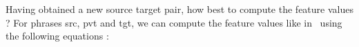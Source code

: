 \begin{comment}
Facing a new low resource language pair, several questions arise when trying to use triangulation. 

\begin{itemize}\addtolength{\itemsep}{-0.4\baselineskip}
        \item How large should the triangulated table be?
        \item What is the best way to compute feature values in the triangulated phrase table?
        \item When combining with the direct system, do we use linear interpolation or alternative decoding paths?
        \item Is the approach of cascading a viable option?
        \item How does one penalize triangulated phrase pairs with insufficient alignment between the words in the phrase pairs?
\end{itemize}


All the papers that use triangulation in machine translation cite either \cite{Utiyama:07} or \cite{Cohn:07}, both published in 2007 (and sometimes cite both of them but use either one model or the other). However, these two papers introduce triangulation for phrase-based SMT in very different ways and their models are different from each other. To our knowledge, before this paper there has been no in-depth study of the different choices in building an SMT system using triangulation. Another limitation of the original work in triangulation~\cite{Utiyama:07,Cohn:07} is the unrealistic use of languages with abundant parallel data to simulate low-resource languages. Subsequent work~\cite{Nakov:12,Nakovemnlp:12,Gispert:06,Huck:12} has also assumed that parallel data in pivot languages can be found in the same domain as the original resource-poor language pair. This kind of domain similarity is not easy to find for realistic low-resource settings. In this paper, we consider and answer these design issues for real-world low-resource language pairs, building an effective machine translation for some of these languages for the first time. In constrast, in this dissertation, we improve translation quality by using triangulation through careful consideration of the triangulation design options listed above. Furthermore, in all four languages since the low-resource language pair and pivot language pair data typically come from very different domains, we use insights from domain adaptation to fine-tune the weighted mixture of direct and pivot based phrase pairs to significantly improve translation quality. 

\end{comment}
Having obtained a new source target pair, how best to compute the feature values ? For phrases src, pvt and tgt, we can compute the feature values like in~\cite{Utiyama:07} using the following equations : 

